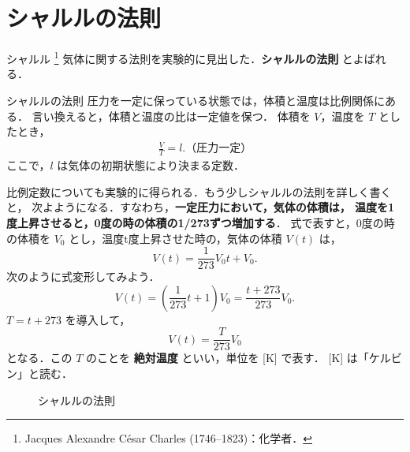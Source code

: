         \section{シャルルの法則}
            シャルル
                \footnote{
                    Jacques Alexandre C\'{e}sar Charles (1746--1823)：化学者．
                }
            気体に関する法則を実験的に見出した．\textbf{シャルルの法則} とよばれる．
                \begin{myshadebox}{シャルルの法則}
                    圧力を一定に保っている状態では，体積と温度は比例関係にある．
                    言い換えると，体積と温度の比は一定値を保つ．
                    体積を $V$，温度を $T$ としたとき，
                    \begin{align}
                        \frac{V}{T} = l. \mbox{（圧力一定）}
                    \end{align}
                    ここで，$l$ は気体の初期状態により決まる定数．
                \end{myshadebox}

            比例定数についても実験的に得られる．もう少しシャルルの法則を詳しく書くと，
            次よようになる．すなわち，\textbf{一定圧力において，気体の体積は，
            温度を1度上昇させると，0度の時の体積の1/273ずつ増加する}．
            式で表すと，0度の時の体積を ${V}_{0}$ とし，温度t度上昇させた時の，気体の体積 $V(t)$ は，
                \begin{equation*}
                    V(t) = \frac{1}{273} {V}_{0}t + {V}_{0}.
                \end{equation*}
            次のように式変形してみよう．
                \begin{equation*}
                    V(t) = \left( \frac{1}{273}t + 1 \right) {V}_{0} = \frac{t+273}{273} {V}_{0}.
                \end{equation*}
            $T=t+273$ を導入して，
                \begin{equation*}
                    V(t) = \frac{T}{273} {V}_{0}
                \end{equation*}
            となる．この $T$ のことを \textbf{絶対温度} といい，単位を [K] で表す．
            [K] は「ケルビン」と読む．
                \begin{figure}[hbt]
                    \begin{center}
                        \caption{シャルルの法則}
                        \label{fig:charlesNohousoku}
                    \end{center}
                \end{figure}



